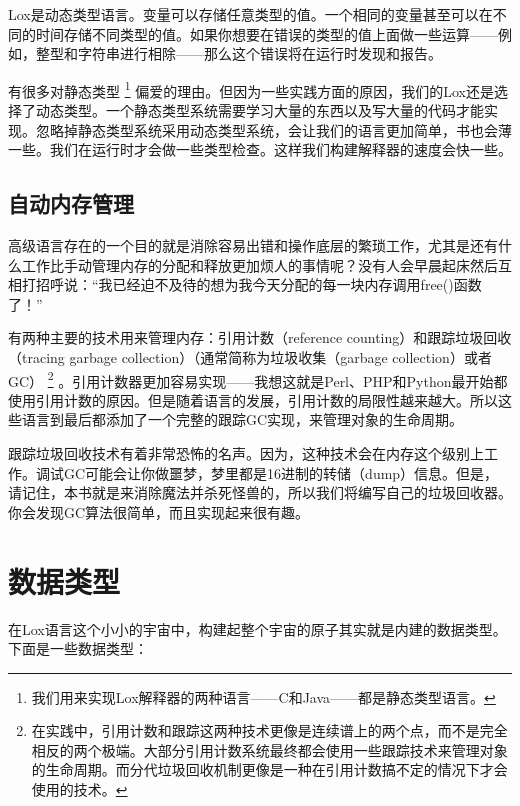 \documentclass[cn,10pt,math=newtx,citestyle=gb7714-2015,bibstyle=gb7714-2015]{elegantbook}
\begin{document}
Lox是动态类型语言。变量可以存储任意类型的值。一个相同的变量甚至可以在不同的时间存储不同类型的值。如果你想要在错误的类型的值上面做一些运算——例如，整型和字符串进行相除——那么这个错误将在运行时发现和报告。

有很多对静态类型 \footnote{我们用来实现Lox解释器的两种语言——C和Java——都是静态类型语言。} 偏爱的理由。但因为一些实践方面的原因，我们的Lox还是选择了动态类型。一个静态类型系统需要学习大量的东西以及写大量的代码才能实现。忽略掉静态类型系统采用动态类型系统，会让我们的语言更加简单，书也会薄一些。我们在运行时才会做一些类型检查。这样我们构建解释器的速度会快一些。

\subsection{自动内存管理}

高级语言存在的一个目的就是消除容易出错和操作底层的繁琐工作，尤其是还有什么工作比手动管理内存的分配和释放更加烦人的事情呢？没有人会早晨起床然后互相打招呼说：“我已经迫不及待的想为我今天分配的每一块内存调用free()函数了！”

有两种主要的技术用来管理内存：引用计数（reference counting）和跟踪垃圾回收（tracing garbage collection）（通常简称为垃圾收集（garbage collection）或者GC） \footnote{在实践中，引用计数和跟踪这两种技术更像是连续谱上的两个点，而不是完全相反的两个极端。大部分引用计数系统最终都会使用一些跟踪技术来管理对象的生命周期。而分代垃圾回收机制更像是一种在引用计数搞不定的情况下才会使用的技术。} 。引用计数器更加容易实现——我想这就是Perl、PHP和Python最开始都使用引用计数的原因。但是随着语言的发展，引用计数的局限性越来越大。所以这些语言到最后都添加了一个完整的跟踪GC实现，来管理对象的生命周期。

跟踪垃圾回收技术有着非常恐怖的名声。因为，这种技术会在内存这个级别上工作。调试GC可能会让你做噩梦，梦里都是16进制的转储（dump）信息。但是，请记住，本书就是来消除魔法并杀死怪兽的，所以我们将编写自己的垃圾回收器。你会发现GC算法很简单，而且实现起来很有趣。

\section{数据类型}

在Lox语言这个小小的宇宙中，构建起整个宇宙的原子其实就是内建的数据类型。下面是一些数据类型：
\end{document}
